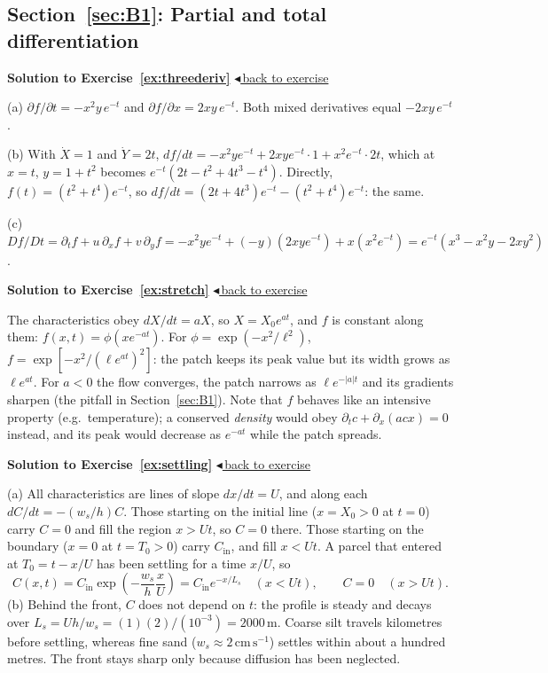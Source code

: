 \documentclass[11pt,letterpaper]{article}
\numberwithin{equation}{section}
\newcommand{\units}[1]{\,\mathrm{#1}}
\newenvironment{solution}[1]{%
  \par\addvspace{1.0ex}\noindent\phantomsection\label{sol:#1}%
  {\color{exorange!85!black}\bfseries Solution to Exercise~\ref{ex:#1}}%
  \hfill\hyperref[ex:#1]{\small$\blacktriangleleft$\,back to exercise}\par\nopagebreak\smallskip}%
  {\par\smallskip\noindent{\color{exorange!40}\rule{\linewidth}{0.4pt}}\par}
\begin{document}
\subsection*{Section~\ref{sec:B1}: Partial and total differentiation}

\begin{solution}{threederiv}
(a) $\partial f/\partial t=-x^2y\,e^{-t}$ and $\partial f/\partial x=2xy\,e^{-t}$. Both mixed derivatives equal $-2xy\,e^{-t}$.

(b) With $\dot X=1$ and $\dot Y=2t$,
$df/dt=-x^2ye^{-t}+2xye^{-t}\cdot1+x^2e^{-t}\cdot2t$, which at $x=t$, $y=1+t^2$ becomes $e^{-t}(2t-t^2+4t^3-t^4)$.
Directly, $f(t)=(t^2+t^4)e^{-t}$, so $df/dt=(2t+4t^3)e^{-t}-(t^2+t^4)e^{-t}$: the same.

(c) $Df/Dt=\partial_tf+u\,\partial_xf+v\,\partial_yf=-x^2ye^{-t}+(-y)(2xye^{-t})+x(x^2e^{-t})=e^{-t}(x^3-x^2y-2xy^2)$.
\end{solution}

\begin{solution}{stretch}
The characteristics obey $dX/dt=aX$, so $X=X_0e^{at}$, and $f$ is constant along them: $f(x,t)=\phi(xe^{-at})$. For
$\phi=\exp(-x^2/\ell^2)$, $f=\exp[-x^2/(\ell e^{at})^2]$: the patch keeps its peak value but its width grows as $\ell e^{at}$. For $a<0$ the flow
converges, the patch narrows as $\ell e^{-|a|t}$ and its gradients sharpen (the pitfall in Section~\ref{sec:B1}). Note that $f$ behaves like an
intensive property (e.g.\ temperature); a conserved \emph{density} would obey $\partial_tc+\partial_x(acx)=0$ instead, and its peak would decrease as
$e^{-at}$ while the patch spreads.
\end{solution}

\begin{solution}{settling}
(a) All characteristics are lines of slope $dx/dt=U$, and along each $dC/dt=-(w_s/h)C$. Those starting on the initial line ($x=X_0>0$ at $t=0$)
carry $C=0$ and fill the region $x>Ut$, so $C=0$ there. Those starting on the boundary ($x=0$ at $t=T_0>0$) carry $C_{\mathrm{in}}$, and fill
$x<Ut$. A parcel that entered at $T_0=t-x/U$ has been settling for a time $x/U$, so
\[
C(x,t)=C_{\mathrm{in}}\exp\!\left(-\frac{w_s}{h}\frac{x}{U}\right)=C_{\mathrm{in}}e^{-x/L_s}\quad(x<Ut),\qquad C=0\quad(x>Ut).
\]
(b) Behind the front, $C$ does not depend on $t$: the profile is steady and decays over $L_s=Uh/w_s=(1)(2)/(10^{-3})=2000\units{m}$. Coarse silt
travels kilometres before settling, whereas fine sand ($w_s\approx2\units{cm\,s^{-1}}$) settles within about a hundred metres. The front stays sharp only because diffusion
has been neglected.
\end{solution}
\end{document}
